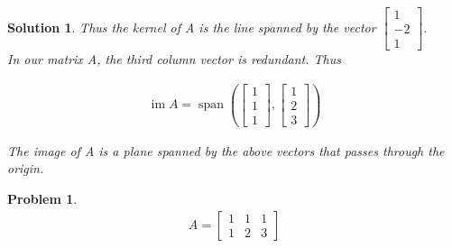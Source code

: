 \documentclass{article}
\newtheorem{problem}{Problem}
\newtheorem*{solution}{Solution}
\DeclareMathOperator{\Span}{span}
\DeclareMathOperator{\im}{im}
\begin{document}
\begin{solution}
Thus the kernel of A is the line spanned by the vector $\begin{bmatrix} 1 \\ -2 \\ 1 \end{bmatrix}.$ \\

In our matrix A, the third column vector is redundant. Thus 

\begin{align*}
\im A = \Span \left( \begin{bmatrix} 1 \\ 1 \\ 1 \end{bmatrix}, \begin{bmatrix} 1 \\ 2 \\ 3 \end{bmatrix} \right)
\end{align*} 

The image of A is a plane spanned by the above vectors that passes through the origin.

\end{solution}

\begin{problem}
\begin{align*}
A = \begin{bmatrix}1 & 1 & 1 \\ 1 & 2 & 3 \end{bmatrix}
\end{align*}
\end{problem}
\end{document}
